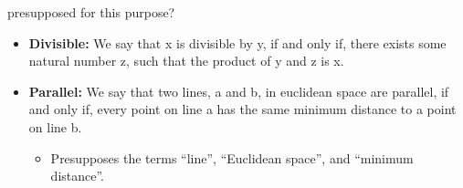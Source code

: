 \begin{enumerate}
  presupposed for this purpose?
  \begin{itemize}
  \item \textbf{Divisible:} We say that x is divisible by y, if and
    only if, there exists some natural number z, such that the product
    of y and z is x.
  \item \textbf{Parallel:} We say that two lines, a and b, in
    euclidean space are parallel, if and only if, every point on line
    a has the same minimum distance to a point on line b.
    \begin{itemize}
      \item Presupposes the terms ``line'', ``Euclidean space'', and
        ``minimum distance''.
    \end{itemize}
  \end{itemize}

\end{enumerate}
